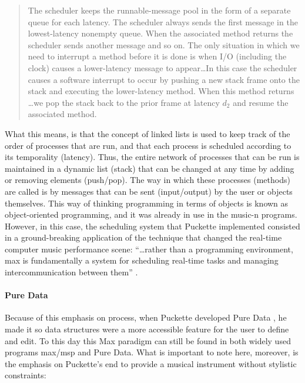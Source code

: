 	\begin{quote}
		The scheduler keeps the runnable-message pool in the form of a separate queue for each latency. The scheduler always sends the first message in the lowest-latency nonempty queue. When the associated method returns the scheduler sends another message and so on. The only situation in which we need to interrupt a method before it is done is when I/O (including the clock) causes a lower-latency message to appear\dots In this case the scheduler causes a software interrupt to occur by pushing a new stack frame onto the stack and executing the lower-latency method. When this method returns \dots we pop the stack back to the prior frame at latency \(d_2\) and resume the associated method. \parencite[46]{DBLP:conf/icmc/Puckette86}
	\end{quote}

	What this means, is that the concept of linked lists is used to keep track of the order of processes that are run, and that each process is scheduled according to its temporality (latency). Thus, the entire network of processes that can be run is maintained in a dynamic list (stack) that can be changed at any time by adding or removing elements (push/pop). The way in which these processes (methods) are called is by messages that can be sent (input/output) by the user or objects themselves. This way of thinking programming in terms of objects is known as object-oriented programming, and it was already in use in the \gls{music-n} programs. However, in this case, the scheduling system that Puckette implemented consisted in a ground-breaking application of the technique that changed the real-time computer music performance scene: ``\dots rather than a programming environment, \gls{max} is fundamentally a system for scheduling real-time tasks and managing intercommunication between them'' \parencite{DBLP:journals/comj/Puckette02}.

	\paragraph{Pure Data}
	\label{computer:puredata}

	Because of this emphasis on process, when Puckette developed Pure Data \parencite{icmc/bbp2372.1997.060}, he made it so data structures were a more accessible feature for the user to define and edit. To this day this Max paradigm \parencite{DBLP:journals/comj/Puckette02} can still be found in both widely used programs \gls{max/msp} \parencite{DBLP:conf/icmc/Zicarelli98} and Pure Data. What is important to note here, moreover, is the emphasis on Puckette's end to provide a musical instrument without stylistic constraints:

